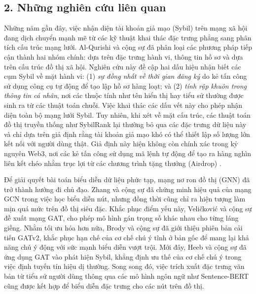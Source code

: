 \subsection{2. Những nghiên cứu liên quan}

\indent\indent Những năm gần đây, việc nhận diện tài khoản giả mạo (Sybil) trên mạng xã hội đang dịch chuyển mạnh mẽ từ các kỹ thuật khai thác đặc trưng phẳng sang phân tích cấu trúc mạng lưới. Al-Qurishi và cộng sự \cite{al2017sybil} đã phân loại các phương pháp tiếp cận thành hai nhóm chính: dựa trên đặc trưng hành vi, thông tin hồ sơ và dựa trên cấu trúc đồ thị xã hội. Nghiên cứu này đề cập hai dấu hiệu nhận biết các cụm Sybil về mặt hành vi: (1) \textit{sự đồng nhất về thời gian đăng ký} do kẻ tấn công sử dụng công cụ tự động để tạo lập hồ sơ hàng loạt; và (2) \textit{tính rập khuôn trong thông tin cá nhân}, nơi các thuộc tính như tên hiển thị hay tiểu sử thường được sinh ra từ các thuật toán chuỗi. Việc khai thác các dấu vết này cho phép nhận diện toàn bộ mạng lưới Sybil. Tuy nhiên, khi xét về mặt cấu trúc, các thuật toán đồ thị truyền thống như SybilRank lại thường bỏ qua các đặc trưng dữ liệu này và chỉ dựa trên giả định rằng tài khoản giả mạo khó có thể thiết lập số lượng lớn kết nối với người dùng thật. Giả định này hiện không còn chính xác trong kỷ nguyên Web3, nơi các kẻ tấn công sử dụng mã lệnh tự động để tạo ra hàng nghìn liên kết chéo nhằm trục lợi từ các chương trình tặng thưởng (Airdrop) \cite{liu2025detecting}.\vspace{0.3cm}

Để giải quyết bài toán biểu diễn dữ liệu phức tạp, mạng nơ ron đồ thị (GNN) đã trở thành hướng đi chủ đạo. Zhang và cộng sự \cite{zhang2019graph} đã chứng minh hiệu quả của mạng GCN trong việc học biểu diễn nút, nhưng đồng thời cũng chỉ ra hiện tượng làm mịn quá mức trên đồ thị siêu đặc. Khắc phục điểm yếu này, Veličković và cộng sự \cite{velickovic2017graph} đề xuất mạng GAT, cho phép mô hình gán trọng số khác nhau cho từng láng giềng. Nhằm tối ưu hóa hơn nữa, Brody và cộng sự \cite{brody2021how} đã giới thiệu phiên bản cải tiến GATv2, khắc phục hạn chế của cơ chế chú ý tĩnh ở bản gốc để mang lại khả năng chú ý động với sức mạnh biểu diễn vượt trội. Mới đây, Heeb và cộng sự \cite{heeb2024sybil} đã ứng dụng GAT vào phát hiện Sybil, khẳng định ưu thế của cơ chế chú ý trong việc định tuyến tín hiệu dị thường. Song song đó, việc trích xuất đặc trưng văn bản từ tiểu sử người dùng thông qua các mô hình ngôn ngữ như Sentence-BERT \cite{reimers2019sentence} cũng được kết hợp để biểu diễn đặc trưng cho các nút trên đồ thị.\vspace{0.3cm}

